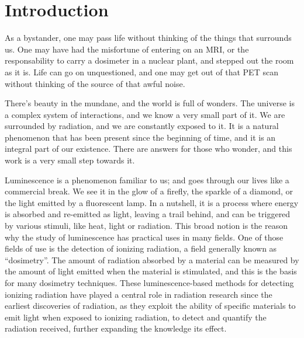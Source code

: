 \chapter{Introduction}



As a bystander, one may pass life without thinking of the things that surrounds us. One may have had the misfortune of entering on an MRI, or the responsability to carry a dosimeter in a nuclear plant, and stepped out the room as it is. Life can go on unquestioned, and one may get out of that PET scan without thinking of the source of that awful noise. 

\vspace{10pt}

There's beauty in the mundane, and the world is full of wonders. The universe is a complex system of interactions, and we know a very small part of it. We are surrounded by radiation, and we are constantly exposed to it. It is a natural phenomenon that has been present since the beginning of time, and it is an integral part of our existence. There are answers for those who wonder, and this work is a very small step towards it.

\vspace{10pt}

Luminescence is a phenomenon familiar to us; and goes through our lives like a commercial break. We see it in the glow of a firefly, the sparkle of a diamond, or the light emitted by a fluorescent lamp. In a nutshell, it is a process where energy is absorbed and re-emitted as light, leaving a trail behind, and can be triggered by various stimuli, like heat, light or radiation. This broad notion is the reason why the study of luminescence has practical uses in many fields. One of those fields of use is the detection of ionizing radiation, a field generally known as ``dosimetry''. The amount of radiation absorbed by a material can be measured by the amount of light emitted when the material is stimulated, and this is the basis for many dosimetry techniques. These luminescence-based methods for detecting ionizing radiation have played a central role in radiation research since the earliest discoveries of radiation, as they exploit the ability of specific materials to emit light when exposed to ionizing radiation, to detect and quantify the radiation received, further expanding the knowledge its effect. 

